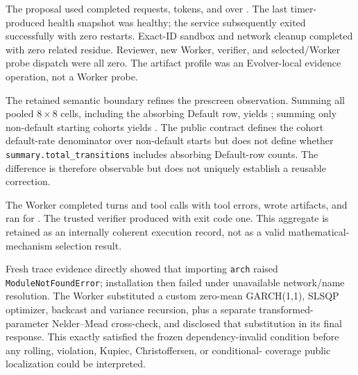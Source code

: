 The proposal used \CreditMigrationProposalRequests{} completed requests,
\CreditMigrationProposalTokens{} tokens, and \CreditMigrationProposalCost{}
over \CreditMigrationProposalWall{}. The last timer-produced health snapshot
was healthy; the service subsequently exited successfully with zero restarts.
Exact-ID sandbox and network cleanup completed with zero related residue.
Reviewer, new Worker, verifier, and selected/Worker probe dispatch were all
zero. The artifact profile was an Evolver-local evidence operation, not a
Worker probe.

The retained semantic boundary refines the prescreen observation. Summing all
pooled $8\times8$ cells, including the absorbing Default row, yields
\CreditMigrationHZeroSummaryMass{}; summing only non-default starting cohorts
yields \CreditMigrationHZeroCohortMass{}. The public contract defines the
cohort default-rate denominator over non-default starts but does not define
whether \texttt{summary.total\_transitions} includes absorbing Default-row
counts. The \CreditMigrationHZeroMassGap{} difference is therefore observable
but does not uniquely establish a reusable correction.


The Worker completed \EvtPotHZeroTurns{} turns and
\EvtPotHZeroToolCalls{} tool calls with \EvtPotHZeroToolErrors{} tool errors,
wrote \EvtPotHZeroArtifacts{} artifacts, and ran for \EvtPotHZeroWall{}. The
trusted verifier produced \EvtPotHZeroOfficial{} with exit code one. This
aggregate is retained as an internally coherent execution record, not as a
valid mathematical-mechanism selection result.

Fresh trace evidence directly showed that importing \texttt{arch} raised
\texttt{ModuleNotFoundError}; installation then failed under unavailable
network/name resolution. The Worker substituted a custom zero-mean
GARCH(1,1), SLSQP optimizer, backcast and variance recursion, plus a separate
transformed-parameter Nelder--Mead cross-check, and disclosed that substitution
in its final response. This exactly satisfied the frozen dependency-invalid
condition before any rolling, violation, Kupiec, Christoffersen, or conditional-
coverage public localization could be interpreted.

